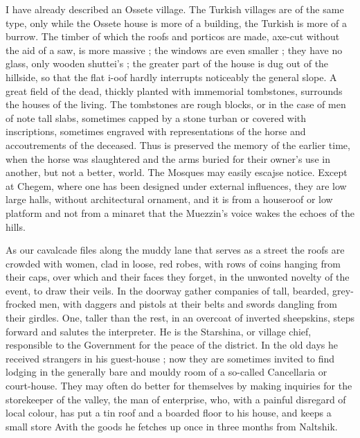 \documentclass[25pt, a4paper]{article}
\begin{document}
	
	
	
	I have already described an Ossete village. The Turkish villages are of the same type, only while the Ossete house is more of a building, the Turkish is more of a burrow. The timber of which the roofs and porticos are made, axe-cut without the aid of a saw, is more massive ; the windows are even smaller ; they have no glass, only wooden shuttei's ; the greater part of the house is dug out of the hillside, so that the flat i-oof hardly interrupts noticeably the general slope. A great field of the dead, thickly planted with immemorial tombstones, surrounds the houses of the living. The tombstones are rough blocks, or in the case of men of note tall slabs, sometimes capped by a stone turban or covered with inscriptions, sometimes engraved with representations of the horse and accoutrements of the deceased. Thus is preserved the memory of the earlier time, when the horse was slaughtered and the arms buried for their owner's use in another, but not a better, world. The Mosques may easily escajse notice. Except at Chegem, where one has been designed under external influences, they are low large halls, without architectural ornament, and it is from a houseroof or low platform and not from a minaret that the Muezzin's voice wakes the echoes of the hills.
	
	As our cavalcade files along the muddy lane that serves as a street the roofs are crowded with women, clad in loose, red robes, with rows of coins hanging from their caps, over which and their faces they forget, in the unwonted novelty of the event, to draw their veils. In the doorway gather companies of tall, bearded, grey-frocked men, with daggers and pistols at their belts and swords dangling from their girdles. One, taller than the rest, in an overcoat of inverted sheepskins, steps forward and salutes the interpreter. He is the Starshina, or village chief, responsible to the Government for the peace of the district. In the old days he received strangers in his guest-house ; now they are sometimes invited to find lodging in the generally bare and mouldy room of a so-called Cancellaria or court-house. They may often do better for themselves by making inquiries for the storekeeper of the valley, the man of enterprise, who, with a painful disregard of local colour, has put a tin roof and a boarded floor to his house, and keeps a small store Avith the goods he fetches up once in three months from Naltshik.
	
\end{document}
